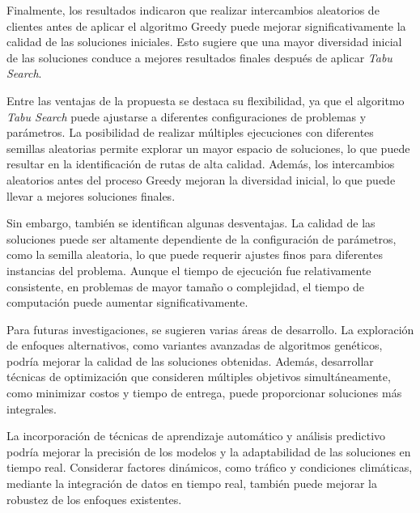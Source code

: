 \documentclass[letter, 10pt]{article}
\begin{document}
Finalmente, los resultados indicaron que realizar intercambios aleatorios de clientes antes de aplicar el algoritmo Greedy puede mejorar significativamente la calidad de las soluciones iniciales. Esto sugiere que una mayor diversidad inicial de las soluciones conduce a mejores resultados finales después de aplicar \textit{Tabu Search}.

Entre las ventajas de la propuesta se destaca su flexibilidad, ya que el algoritmo \textit{Tabu Search} puede ajustarse a diferentes configuraciones de problemas y parámetros. La posibilidad de realizar múltiples ejecuciones con diferentes semillas aleatorias permite explorar un mayor espacio de soluciones, lo que puede resultar en la identificación de rutas de alta calidad. Además, los intercambios aleatorios antes del proceso Greedy mejoran la diversidad inicial, lo que puede llevar a mejores soluciones finales.

Sin embargo, también se identifican algunas desventajas. La calidad de las soluciones puede ser altamente dependiente de la configuración de parámetros, como la semilla aleatoria, lo que puede requerir ajustes finos para diferentes instancias del problema. Aunque el tiempo de ejecución fue relativamente consistente, en problemas de mayor tamaño o complejidad, el tiempo de computación puede aumentar significativamente.

Para futuras investigaciones, se sugieren varias áreas de desarrollo. La exploración de enfoques alternativos, como variantes avanzadas de algoritmos genéticos, podría mejorar la calidad de las soluciones obtenidas. Además, desarrollar técnicas de optimización que consideren múltiples objetivos simultáneamente, como minimizar costos y tiempo de entrega, puede proporcionar soluciones más integrales.

La incorporación de técnicas de aprendizaje automático y análisis predictivo podría mejorar la precisión de los modelos y la adaptabilidad de las soluciones en tiempo real. Considerar factores dinámicos, como tráfico y condiciones climáticas, mediante la integración de datos en tiempo real, también puede mejorar la robustez de los enfoques existentes.




\end{document}
